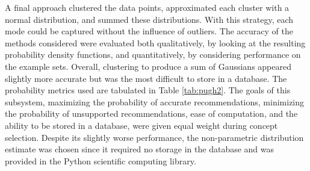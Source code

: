 \documentclass[11pt]{article} %
\begin{document}
\newline \quad \newline
A final approach clustered the data points, approximated each cluster with a normal distribution, and summed these distributions. With this strategy, each mode could be captured without the influence of outliers. The accuracy of the methods considered were evaluated both qualitatively, by looking at the resulting probability density functions, and quantitatively, by considering performance on the example sets. Overall, clustering to produce a sum of Gaussians appeared slightly more accurate but was the most difficult to store in a database. The probability metrics used are tabulated in Table \ref{tab:pugh2}. The goals of this subsystem, maximizing the probability of accurate recommendations, minimizing the probability of unsupported recommendations, ease of computation, and the ability to be stored in a database, were given equal weight during concept selection. Despite its slightly worse performance, the non-parametric distribution estimate was chosen since it required no storage in the database and was provided in the Python scientific computing library.
\end{document}
